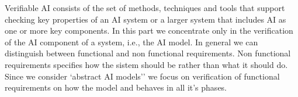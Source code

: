   

Verifiable AI consists of the set of methods, techniques and tools
that support checking key properties of an AI system or a larger
system that includes AI as one or more key components.  In this part
we concentrate only in the verification of the AI component of a
system, i.e., the AI model. In general we can distinguish between
functional and non functional requirements. Non functional
requirements specifies how the sistem should be rather than what it
should do. Since we consider `abstract AI models'' we focus on
verification of functional requirements on how the model and behaves
in all it's phases. 
  

